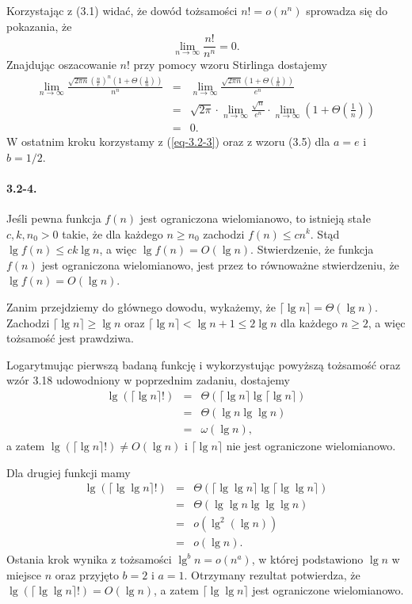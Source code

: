 Korzystając z (3.1) widać, że dowód tożsamości $n!=o(n^n)$ sprowadza się do pokazania, że
\[
  \lim_{n\to\infty}\frac{n!}{n^n}=0.
\]
Znajdując oszacowanie $n!$ przy pomocy wzoru Stirlinga dostajemy
\begin{eqnarray*}
  \lim_{n\to\infty}\frac{\sqrt{2\pi n}\left(\frac{n}{e}\right)^n\left(1+\Theta\left(\frac{1}{n}\right)\right)}{n^n} &=& \lim_{n\to\infty}\frac{\sqrt{2\pi n}\left(1+\Theta\left(\frac{1}{n}\right)\right)}{e^n} \\
  &=& \sqrt{2\pi}\cdot\lim_{n\to\infty}\frac{\sqrt{n}}{e^n}\cdot\lim_{n\to\infty}\left(1+\Theta\left(\frac{1}{n}\right)\right) \\
  &=& 0.
\end{eqnarray*}
W ostatnim kroku korzystamy z (\ref{eq-3.2-3}) oraz z wzoru (3.5) dla $a=e$ i $b=1/2$.

\paragraph{3.2-4.}
Jeśli pewna funkcja $f(n)$ jest ograniczona wielomianowo, to istnieją stałe $c,k,n_0>0$ takie, że dla każdego $n\ge n_0$ zachodzi $f(n)\le cn^k$. Stąd $\lg f(n)\le ck\lg n$, a więc $\lg f(n)=O(\lg n)$. Stwierdzenie, że funkcja $f(n)$ jest ograniczona wielomianowo, jest przez to  równoważne stwierdzeniu, że $\lg f(n)=O(\lg n)$.

Zanim przejdziemy do głównego dowodu, wykażemy, że $\lceil\lg n\rceil=\Theta(\lg n)$. Zachodzi $\lceil\lg n\rceil\ge\lg n$ oraz $\lceil\lg n\rceil<\lg n+1\le 2\lg n$ dla każdego $n\ge 2$, a więc tożsamość jest prawdziwa.

Logarytmując pierwszą badaną funkcję i wykorzystując powyższą tożsamość oraz wzór 3.18 udowodniony w poprzednim zadaniu, dostajemy
\begin{eqnarray*}
  \lg\left(\lceil\lg n\rceil!\right) &=& \Theta\left(\lceil\lg n\rceil\lg\lceil\lg n\rceil\right) \\
  &=& \Theta(\lg n\lg\lg n) \\
  &=& \omega(\lg n),
\end{eqnarray*}
a zatem $\lg\left(\lceil\lg n\rceil!\right)\ne O(\lg n)$ i $\lceil\lg n\rceil$ nie jest ograniczone wielomianowo.

Dla drugiej funkcji mamy
\begin{eqnarray*}
  \lg\left(\lceil\lg\lg n\rceil!\right) &=& \Theta\left(\lceil\lg\lg n\rceil\lg\lceil\lg\lg n\rceil\right) \\
  &=& \Theta(\lg\lg n\lg\lg\lg n) \\
  &=& o\left(\lg^2(\lg n)\right) \\
  &=& o(\lg n).
\end{eqnarray*}
Ostania krok wynika z tożsamości $\lg^bn=o(n^a)$, w której podstawiono $\lg n$ w miejsce $n$ oraz przyjęto $b=2$ i $a=1$. Otrzymany rezultat potwierdza, że $\lg\left(\lceil\lg\lg n\rceil!\right)=O(\lg n)$, a zatem $\lceil\lg\lg n\rceil$ jest ograniczone wielomianowo.


